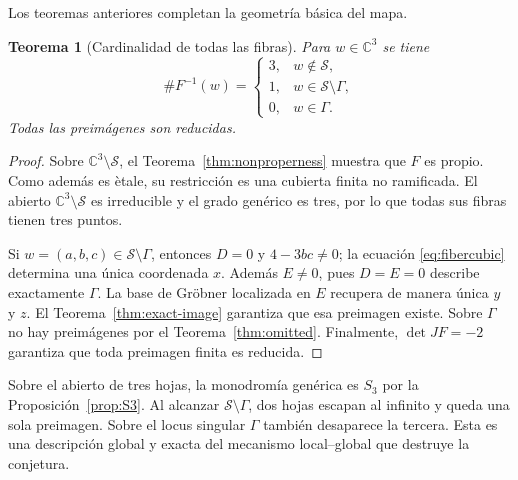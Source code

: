 \documentclass[11pt]{article}
\newtheorem{theorem}{Teorema}[section]
\theoremstyle{definition}
\theoremstyle{remark}
\newcommand{\C}{\mathbb{C}}
\begin{document}
Los teoremas anteriores completan la geometr\'ia b\'asica del mapa.

\begin{theorem}[Cardinalidad de todas las fibras]\label{thm:fiber-strata}
Para $w\in\C^3$ se tiene
\[
\#F^{-1}(w)=
\begin{cases}
3,&w\notin\mathcal S,\\
1,&w\in\mathcal S\setminus\Gamma,\\
0,&w\in\Gamma.
\end{cases}
\]
Todas las preim\'agenes son reducidas.
\end{theorem}

\begin{proof}
Sobre $\C^3\setminus\mathcal S$, el
Teorema~\ref{thm:nonproperness} muestra que $F$ es propio. Como adem\'as es
\`etale, su restricci\'on es una cubierta finita no ramificada. El abierto
$\C^3\setminus\mathcal S$ es irreducible y el grado gen\'erico es tres, por lo
que todas sus fibras tienen tres puntos.

Si $w=(a,b,c)\in\mathcal S\setminus\Gamma$, entonces $D=0$ y
$4-3bc\neq0$; la ecuaci\'on \eqref{eq:fibercubic} determina una \'unica
coordenada $x$. Adem\'as $E\neq0$, pues $D=E=0$ describe exactamente
$\Gamma$. La base de Gr\"obner localizada en $E$ recupera de manera \'unica
$y$ y $z$. El Teorema~\ref{thm:exact-image} garantiza que esa preimagen
existe. Sobre $\Gamma$ no hay preim\'agenes por el
Teorema~\ref{thm:omitted}. Finalmente, $\det JF=-2$ garantiza que toda
preimagen finita es reducida.
\end{proof}

Sobre el abierto de tres hojas, la monodrom\'ia gen\'erica es $S_3$ por la
Proposici\'on~\ref{prop:S3}. Al alcanzar
$\mathcal S\setminus\Gamma$, dos hojas escapan al infinito y queda una sola
preimagen. Sobre el locus singular $\Gamma$ tambi\'en desaparece la tercera.
Esta es una descripci\'on global y exacta del mecanismo local--global que
destruye la conjetura.
\end{document}
